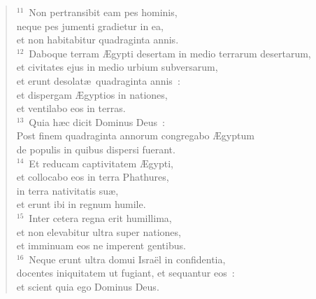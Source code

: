 \begin{flushleft}
\begin{verse}
${}^{11}$~Non pertransibit eam pes hominis,\\ neque pes jumenti gradietur in ea,\\ et non habitabitur quadraginta annis.\\
${}^{12}$~Daboque terram \AE gypti desertam in medio terrarum desertarum,\\ et civitates ejus in medio urbium subversarum,\\ et erunt desolat\ae\ quadraginta annis~:\\ et dispergam \AE gyptios in nationes,\\ et ventilabo eos in terras.\\
${}^{13}$~Quia h\ae c dicit Dominus Deus~:\\ Post finem quadraginta annorum congregabo \AE gyptum\\ de populis in quibus dispersi fuerant.\\
${}^{14}$~Et reducam captivitatem \AE gypti,\\ et collocabo eos in terra Phathures,\\ in terra nativitatis su\ae ,\\ et erunt ibi in regnum humile.\\
${}^{15}$~Inter cetera regna erit humillima,\\ et non elevabitur ultra super nationes,\\ et imminuam eos ne imperent gentibus.\\
${}^{16}$~Neque erunt ultra domui Isra\"el in confidentia,\\ docentes iniquitatem ut fugiant, et sequantur eos~:\\ et scient quia ego Dominus Deus.\end{verse}\end{flushleft}


